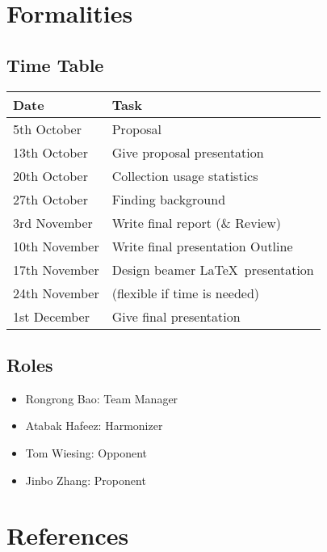 \documentclass[a4paper,10pt]{article}
\begin{document}
\section{Formalities}
\subsection{Time Table}
\begin{center}
  \begin{tabular}{l | l}
  \hline
  Date & Task \\
  \hline
  5th October & Proposal \\
  13th October & Give proposal presentation \\
  20th October & Collection usage statistics\\
  27th October & Finding background\\
  3rd November & Write final report (\& Review)\\
  10th November & Write final presentation Outline\\
  17th November & Design beamer \LaTeX\ presentation\\
  24th November & (flexible if time is needed)\\
  1st December & Give final presentation\\\hline
  \end{tabular}
\end{center}
\subsection{Roles}
\begin{itemize}
  \item Rongrong Bao: Team Manager
  \item Atabak Hafeez: Harmonizer
  \item Tom Wiesing: Opponent
  \item Jinbo Zhang: Proponent
\end{itemize}
\renewcommand\refname{\vskip -1cm}
\section{References}

\end{document}
